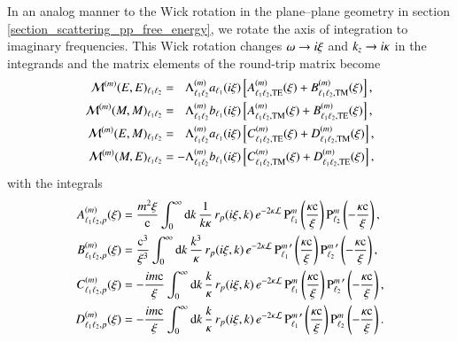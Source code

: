 In an analog manner to the Wick rotation in the plane--plane geometry in section \ref{section_scattering_pp_free_energy}, we
rotate the axis of integration to imaginary frequencies. This Wick rotation
changes $\omega \to i \xi$ and $k_z \to i\kappa$ in the integrands and
the matrix elements of the round-trip matrix become
\begin{align}
\label{eq:4_EE}
\mathcal{M}^{(m)}(E,E)_{\ell_1 \ell_2} &= \phantom{-}\Lambda^{(m)}_{\ell_1 \ell_2} a_{\ell_1}(i\xi) \left[ A^{(m)}_{\ell_1 \ell_2,\mathrm{TE}}(\xi)+ B^{(m)}_{\ell_1 \ell_2, \mathrm{TM}}(\xi)\right], \\
\label{eq:4_MM}
\mathcal{M}^{(m)}(M,M)_{\ell_1 \ell_2} &= \phantom{-}\Lambda^{(m)}_{\ell_1 \ell_2} b_{\ell_1}(i\xi) \left[ A^{(m)}_{\ell_1 \ell_2,\mathrm{TM}}(\xi)+ B^{(m)}_{\ell_1 \ell_2, \mathrm{TE}}(\xi)\right], \\
\label{eq:4_EM}
\mathcal{M}^{(m)}(E,M)_{\ell_1 \ell_2} &= \phantom{-}\Lambda^{(m)}_{\ell_1 \ell_2} a_{\ell_1}(i\xi) \left[ C^{(m)}_{\ell_1 \ell_2,\mathrm{TE}}(\xi)+ D^{(m)}_{\ell_1 \ell_2, \mathrm{TM}}(\xi)\right], \\
\label{eq:4_ME}
\mathcal{M}^{(m)}(M,E)_{\ell_1 \ell_2} &= -\Lambda^{(m)}_{\ell_1 \ell_2} b_{\ell_1}(i\xi) \left[ C^{(m)}_{\ell_1 \ell_2,\mathrm{TM}}(\xi)+ D^{(m)}_{\ell_1 \ell_2, \mathrm{TE}}(\xi)\right],
\end{align}
with the integrals
\begin{align}
\label{scattering_int_A}
A_{\ell_1 \ell_2,p}^{(m)}(\xi) &= \frac{m^2 \xi}{\mathrm{c}} \int_0^\infty \mathrm{d}k \, \frac{1}{k \kappa} \, r_p(i\xi,k) \, e^{-2\kappa\mathcal{L}} \, {\text{P}_{\ell_1}^{m}}\left(\frac{\kappa\mathrm{c}}{\xi}\right) {\text{P}_{\ell_2}^{m}}\left(-\frac{\kappa\mathrm{c}}{\xi}\right), \\
\label{scattering_int_B}
B_{\ell_1 \ell_2,p}^{(m)}(\xi) &= \frac{\mathrm{c}^3}{\xi^3} \int_0^\infty \mathrm{d}k \, \frac{k^3}{\kappa} \, r_p(i\xi,k) \, e^{-2\kappa\mathcal{L}} \, {\text{P}_{\ell_1}^{m}}^\prime\left(\frac{\kappa\mathrm{c}}{\xi}\right) {\text{P}_{\ell_2}^{m}}^\prime\left(-\frac{\kappa\mathrm{c}}{\xi}\right), \\
\label{scattering_int_C}
C_{\ell_1 \ell_2,p}^{(m)}(\xi) &= -\frac{i m\mathrm{c}}{\xi} \int_0^\infty \mathrm{d}k \, \frac{k}{\kappa} \, r_p(i\xi,k) \, e^{-2\kappa\mathcal{L}} \, {\text{P}_{\ell_1}^{m}}\left(\frac{\kappa\mathrm{c}}{\xi}\right) {\text{P}_{\ell_2}^{m}}^\prime\left(-\frac{\kappa\mathrm{c}}{\xi}\right), \\
\label{scattering_int_D}
D_{\ell_1 \ell_2,p}^{(m)}(\xi) &= -\frac{i m\mathrm{c}}{\xi} \int_0^\infty \mathrm{d}k \, \frac{k}{\kappa} \, r_p(i\xi,k) \, e^{-2\kappa\mathcal{L}} \, {\text{P}_{\ell_1}^{m}}^\prime\left(\frac{\kappa\mathrm{c}}{\xi}\right) {\text{P}_{\ell_2}^{m}}\left(-\frac{\kappa\mathrm{c}}{\xi}\right).
\end{align}
